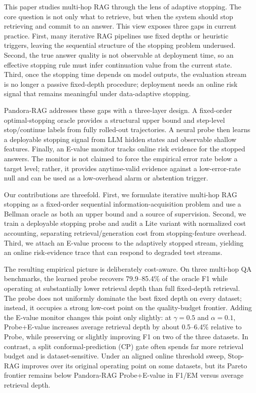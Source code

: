 \documentclass{article}
\newcommand{\method}{Pandora-RAG}
\begin{document}
This paper studies multi-hop RAG through the lens of adaptive stopping. The core question is not only what to retrieve, but when the system should stop retrieving and commit to an answer. This view exposes three gaps in current practice. First, many iterative RAG pipelines use fixed depths or heuristic triggers, leaving the sequential structure of the stopping problem underused. Second, the true answer quality is not observable at deployment time, so an effective stopping rule must infer continuation value from the current state. Third, once the stopping time depends on model outputs, the evaluation stream is no longer a passive fixed-depth procedure; deployment needs an online risk signal that remains meaningful under data-adaptive stopping.

\method{} addresses these gaps with a three-layer design. A fixed-order optimal-stopping oracle provides a structural upper bound and step-level stop/continue labels from fully rolled-out trajectories. A neural probe then learns a deployable stopping signal from LLM hidden states and observable shallow features. Finally, an E-value monitor tracks online risk evidence for the stopped answers. The monitor is not claimed to force the empirical error rate below a target level; rather, it provides anytime-valid evidence against a low-error-rate null and can be used as a low-overhead alarm or abstention trigger.

Our contributions are threefold. First, we formulate iterative multi-hop RAG stopping as a fixed-order sequential information-acquisition problem and use a Bellman oracle as both an upper bound and a source of supervision. Second, we train a deployable stopping probe and audit a Lite variant with normalized cost accounting, separating retrieval/generation cost from stopping-feature overhead. Third, we attach an E-value process to the adaptively stopped stream, yielding an online risk-evidence trace that can respond to degraded test streams.

The resulting empirical picture is deliberately cost-aware. On three multi-hop QA benchmarks, the learned probe recovers 79.9--85.4\% of the oracle F1 while operating at substantially lower retrieval depth than full fixed-depth retrieval. The probe does not uniformly dominate the best fixed depth on every dataset; instead, it occupies a strong low-cost point on the quality-budget frontier. Adding the E-value monitor changes this point only slightly: at $\gamma=0.5$ and $\alpha=0.1$, Probe+E-value increases average retrieval depth by about 0.5--6.4\% relative to Probe, while preserving or slightly improving F1 on two of the three datasets. In contrast, a split conformal-prediction (CP) gate often spends far more retrieval budget and is dataset-sensitive. Under an aligned online threshold sweep, Stop-RAG improves over its original operating point on some datasets, but its Pareto frontier remains below \method{} Probe+E-value in F1/EM versus average retrieval depth.
\end{document}
